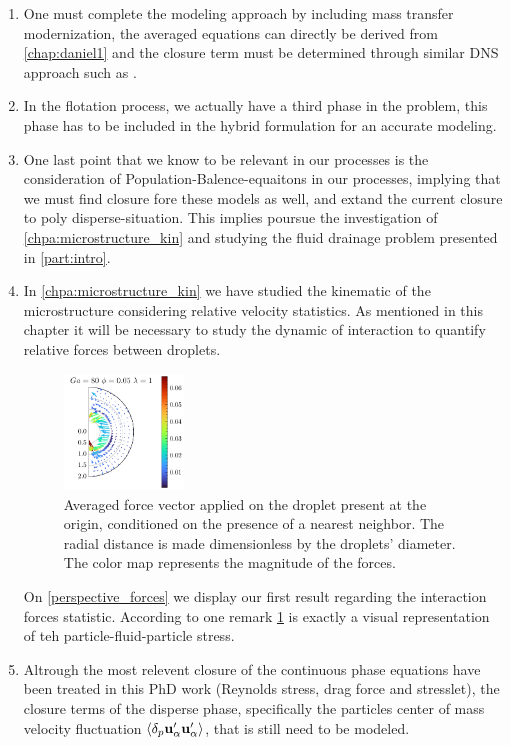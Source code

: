 \begin{enumerate}
    \item One must complete the modeling approach by including mass transfer modernization, the averaged equations can directly be derived from \ref{chap:daniel1} and the closure term must be determined through similar DNS approach such as \citep{hidman2023assessing}. 
    \item In the flotation process, we actually have a third phase in the problem, this phase has to be included in the hybrid formulation for an accurate modeling. 
    \item One last point that we know to be relevant in our processes is the consideration of Population-Balence-equaitons in our processes, implying that we must find closure fore these models as well, and extand the current closure to poly disperse-situation. 
    This implies poursue the investigation of \ref{chpa:microstructure_kin} and studying the fluid drainage problem presented in \ref{part:intro}. 
    \item In \ref{chpa:microstructure_kin} we have studied the kinematic of the microstructure considering relative velocity statistics. 
    As mentioned in this chapter it will be necessary to study the dynamic of interaction to quantify relative forces between droplets. 
    \begin{figure}[h!]
        \centering
        \includegraphics[width=0.3\textwidth]{image/HOMOGENEOUS_final/Dist/F_rel_l_1_Ga_80_PHI_5}
        \caption{Averaged force vector applied on the droplet present at the origin, conditioned on the presence of a nearest neighbor.
        The radial distance is made dimensionless by the droplets' diameter. 
        The color map represents the magnitude of the forces.}
        \label{fig:perspective_forces}
    \end{figure}
    On \ref{perspective_forces} we display our first result regarding the interaction forces statistic. 
    According to \citet{zhang2021ensemble} one remark \ref{fig:perspective_forces} is exactly a visual representation of teh particle-fluid-particle stress. 
    \item Altrough the most relevent closure of the continuous phase equations have been treated in this PhD work (Reynolds stress, drag force and stresslet), the closure terms of the disperse phase, specifically the particles center of mass velocity fluctuation $\left<\delta_p \textbf{u}_\alpha'\textbf{u}_\alpha'\right>$, that is still need to be modeled. 

\end{enumerate}
